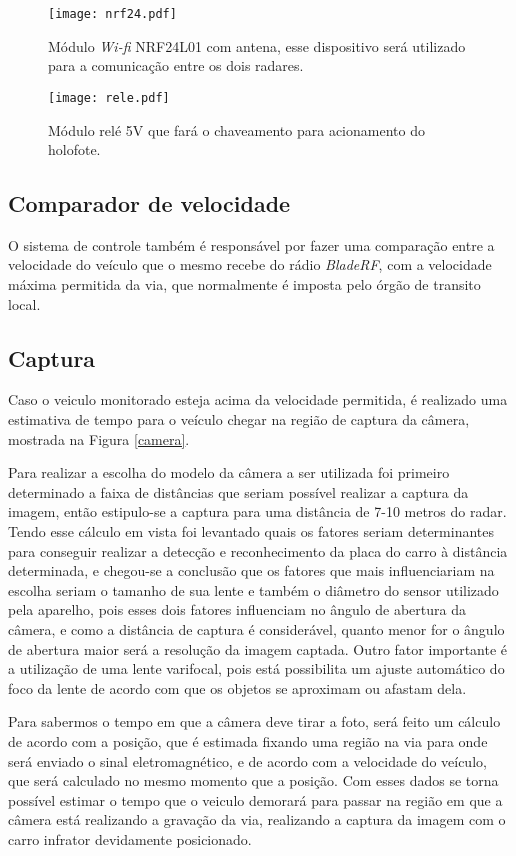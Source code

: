     \begin{figure}[H]
    \centering
    \texttt{[image: nrf24.pdf]}
    \caption{Módulo \emph{Wi-fi} NRF24L01 com antena, esse dispositivo será utilizado para a comunicação entre os dois radares.}
    \label{nrf24}
\end{figure}

    \begin{figure}[H]
    \centering
    \texttt{[image: rele.pdf]}
    \caption{Módulo relé 5V que fará o chaveamento para acionamento do holofote.}
    \label{rele}
\end{figure}

    \subsection{Comparador de velocidade}
    O sistema de controle também é responsável por fazer uma comparação entre a velocidade do veículo que o mesmo recebe do rádio \emph{BladeRF}, com a velocidade máxima permitida da via, que normalmente é imposta pelo órgão de transito local.

    \subsection{Captura}
    Caso o veiculo monitorado esteja acima da velocidade permitida, é realizado uma estimativa de tempo para o veículo chegar na região de captura da câmera, mostrada na Figura \ref{camera}.
    
    Para realizar a escolha do modelo da câmera a ser utilizada foi primeiro determinado a faixa de distâncias que seriam possível realizar a captura da imagem, então estipulo-se a captura para uma distância de 7-10 metros do radar. Tendo esse cálculo em vista foi levantado quais os fatores seriam determinantes para conseguir realizar a detecção e reconhecimento da placa do carro à distância determinada, e chegou-se a conclusão que os fatores que mais influenciariam na escolha seriam o tamanho de sua lente e também o diâmetro do sensor utilizado pela aparelho, pois esses dois fatores influenciam no ângulo de abertura da câmera, e como a distância de captura é considerável, quanto menor for o ângulo de abertura maior será a resolução da imagem captada. Outro fator importante é a utilização de uma lente varifocal, pois está possibilita um ajuste automático do foco da lente de acordo com que os objetos se aproximam ou afastam dela. 
    
    
    Para sabermos o tempo em que a câmera deve tirar a foto, será feito um cálculo de acordo com a posição, que é estimada fixando uma região na via para onde será enviado o sinal eletromagnético, e de acordo com a velocidade do veículo, que  será calculado no mesmo momento que a posição. Com esses dados se torna possível estimar o tempo que o veiculo demorará para passar na região em que a câmera está realizando a gravação da via, realizando a captura da imagem com o carro infrator devidamente posicionado.
    

